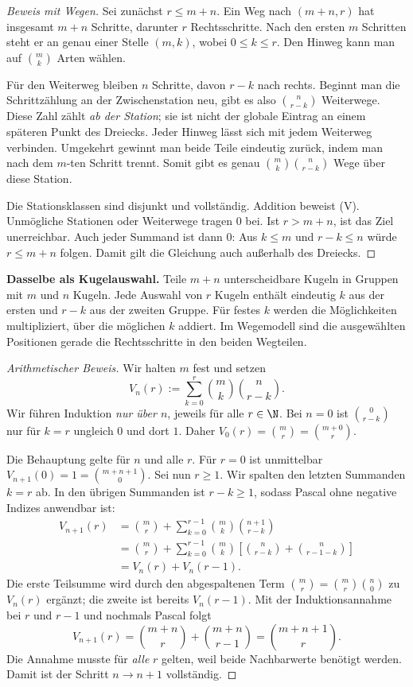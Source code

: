 \begin{proof}[Beweis mit Wegen]
Sei zunächst $r\le m+n$. Ein Weg nach $(m+n,r)$ hat insgesamt
$m+n$ Schritte, darunter $r$ Rechtsschritte. Nach den ersten $m$
Schritten steht er an genau einer Stelle $(m,k)$, wobei $0\le k\le r$.
Den Hinweg kann man auf $\binom mk$ Arten wählen.

Für den Weiterweg bleiben $n$ Schritte, davon $r-k$ nach rechts.
Beginnt man die Schrittzählung an der Zwischenstation neu, gibt es
also $\binom n{r-k}$ Weiterwege. Diese Zahl zählt \emph{ab der Station};
sie ist nicht der globale Eintrag an einem späteren Punkt des Dreiecks.
Jeder Hinweg lässt sich mit jedem Weiterweg verbinden. Umgekehrt
gewinnt man beide Teile eindeutig zurück, indem man nach dem $m$-ten
Schritt trennt. Somit gibt es genau
$\binom mk\binom n{r-k}$ Wege über diese Station.

Die Stationsklassen sind disjunkt und vollständig. Addition beweist
(V). Unmögliche Stationen oder Weiterwege tragen $0$ bei. Ist
$r>m+n$, ist das Ziel unerreichbar. Auch jeder Summand ist dann $0$:
Aus $k\le m$ und $r-k\le n$ würde $r\le m+n$ folgen. Damit gilt die
Gleichung auch außerhalb des Dreiecks.
\end{proof}

\textbf{Dasselbe als Kugelauswahl.}
Teile $m+n$ unterscheidbare Kugeln in Gruppen mit $m$ und $n$ Kugeln.
Jede Auswahl von $r$ Kugeln enthält eindeutig $k$ aus der ersten und
$r-k$ aus der zweiten Gruppe. Für festes $k$ werden die Möglichkeiten
multipliziert, über die möglichen $k$ addiert. Im Wegemodell sind die
ausgewählten Positionen gerade die Rechtsschritte in den beiden Wegteilen.

\begin{proof}[Arithmetischer Beweis]
Wir halten $m$ fest und setzen
\[
 V_n(r):=\sum_{k=0}^r\binom mk\binom n{r-k}.
\]
Wir führen Induktion \emph{nur über $n$}, jeweils für alle $r\in\N$.
Bei $n=0$ ist $\binom0{r-k}$ nur für $k=r$ ungleich $0$ und dort $1$.
Daher $V_0(r)=\binom mr=\binom{m+0}r$.

Die Behauptung gelte für $n$ und alle $r$. Für $r=0$ ist unmittelbar
$V_{n+1}(0)=1=\binom{m+n+1}0$. Sei nun $r\ge1$.
Wir spalten den letzten Summanden $k=r$ ab. In den übrigen Summanden
ist $r-k\ge1$, sodass Pascal ohne negative Indizes anwendbar ist:
\[
 \begin{aligned}
 V_{n+1}(r)
 &=\binom mr+\sum_{k=0}^{r-1}\binom mk\binom{n+1}{r-k}\\
 &=\binom mr+\sum_{k=0}^{r-1}\binom mk
       \left[\binom n{r-k}+\binom n{r-1-k}\right]\\
 &=V_n(r)+V_n(r-1).
 \end{aligned}
\]
Die erste Teilsumme wird durch den abgespaltenen Term
$\binom mr=\binom mr\binom n0$ zu $V_n(r)$ ergänzt;
die zweite ist bereits $V_n(r-1)$.
Mit der Induktionsannahme bei $r$ und $r-1$ und nochmals Pascal folgt
\[
 V_{n+1}(r)=\binom{m+n}r+\binom{m+n}{r-1}
          =\binom{m+n+1}r.
\]
Die Annahme musste für \emph{alle} $r$ gelten, weil beide Nachbarwerte
benötigt werden. Damit ist der Schritt $n\to n+1$ vollständig.
\end{proof}

